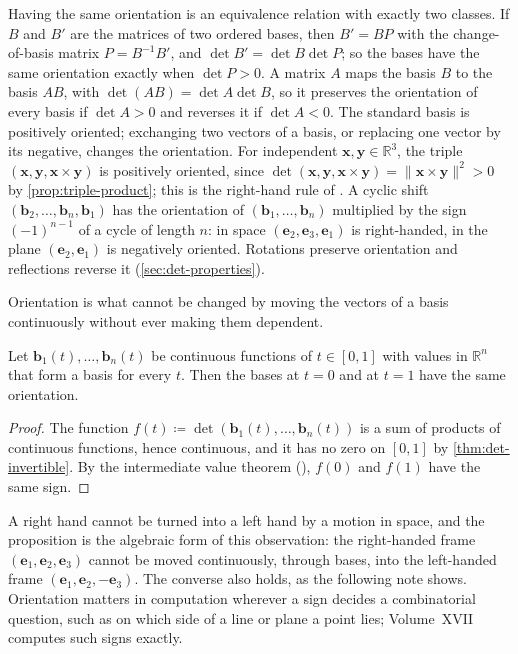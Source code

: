 Having the same orientation is an equivalence relation with exactly two classes. If $B$ and $B'$ are the matrices of two ordered bases, then $B'=BP$ with the change-of-basis matrix $P=B^{-1}B'$, and $\det B'=\det B\det P$; so the bases have the same orientation exactly when $\det P>0$. A matrix $A$ maps the basis $B$ to the basis $AB$, with $\det(AB)=\det A\det B$, so it preserves the orientation of every basis if $\det A>0$ and reverses it if $\det A<0$. The standard basis is positively oriented; exchanging two vectors of a basis, or replacing one vector by its negative, changes the orientation. For independent $\mathbf x,\mathbf y\in\mathbb R^3$, the triple $(\mathbf x,\mathbf y,\mathbf x\times\mathbf y)$ is positively oriented, since $\det(\mathbf x,\mathbf y,\mathbf x\times\mathbf y)=\|\mathbf x\times\mathbf y\|^2>0$ by \cref{prop:triple-product}; this is the right-hand rule of . A cyclic shift $(\mathbf b_2,\ldots,\mathbf b_n,\mathbf b_1)$ has the orientation of $(\mathbf b_1,\ldots,\mathbf b_n)$ multiplied by the sign $(-1)^{n-1}$ of a cycle of length $n$: in space $(\mathbf e_2,\mathbf e_3,\mathbf e_1)$ is right-handed, in the plane $(\mathbf e_2,\mathbf e_1)$ is negatively oriented. Rotations preserve orientation and reflections reverse it (\cref{sec:det-properties}).

Orientation is what cannot be changed by moving the vectors of a basis continuously without ever making them dependent.

\begin{proposition}
\label{prop:orientation-continuous}
Let $\mathbf b_1(t),\ldots,\mathbf b_n(t)$ be continuous functions of $t\in[0,1]$ with values in $\mathbb R^n$ that form a basis for every $t$. Then the bases at $t=0$ and at $t=1$ have the same orientation.
\end{proposition}

\begin{proof}
The function $f(t)\coloneqq\det(\mathbf b_1(t),\ldots,\mathbf b_n(t))$ is a sum of products of continuous functions, hence continuous, and it has no zero on $[0,1]$ by \cref{thm:det-invertible}. By the intermediate value theorem (), $f(0)$ and $f(1)$ have the same sign.
\end{proof}

A right hand cannot be turned into a left hand by a motion in space, and the proposition is the algebraic form of this observation: the right-handed frame $(\mathbf e_1,\mathbf e_2,\mathbf e_3)$ cannot be moved continuously, through bases, into the left-handed frame $(\mathbf e_1,\mathbf e_2,-\mathbf e_3)$. The converse also holds, as the following note shows. Orientation matters in computation wherever a sign decides a combinatorial question, such as on which side of a line or plane a point lies; Volume~XVII computes such signs exactly.

